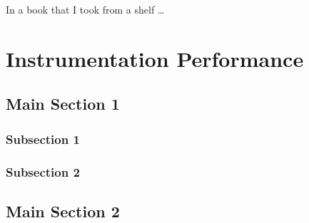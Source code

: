 
\begin{savequote}[45mm]
In a book that I took from a shelf \ldots
{}
\end{savequote}

\chapter{Instrumentation Performance} %

\label{Chapter6} %


\section{Main Section 1}

\subsection{Subsection 1}


\subsection{Subsection 2}


\section{Main Section 2}
